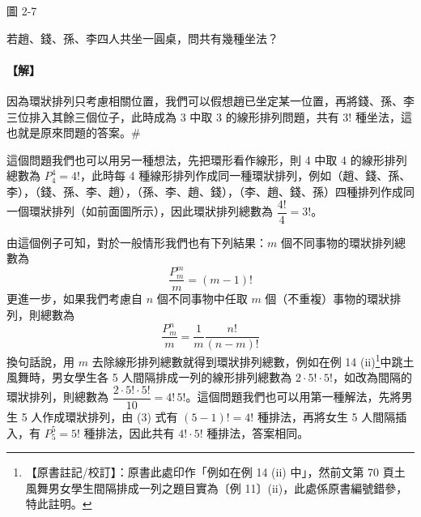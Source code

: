\begin{center}

\vspace{0.3em}
圖 2-7
\end{center}

\begin{example}\label{ex:b5s-2-12}
若趙、錢、孫、李四人共坐一圓桌，問共有幾種坐法？
\end{example}
\paragraph{【解】}
因為環狀排列只考慮相關位置，我們可以假想趙已坐定某一位置，再將錢、孫、李三位排入其餘三個位子，此時成為 3 中取 3 的線形排列問題，共有 $3!$ 種坐法，這也就是原來問題的答案。\hfill\#

這個問題我們也可以用另一種想法，先把環形看作線形，則 4 中取 4 的線形排列總數為 $P_4^4 = 4!$，此時每 4 種線形排列作成同一種環狀排列，例如（趙、錢、孫、李），（錢、孫、李、趙），（孫、李、趙、錢），（李、趙、錢、孫）四種排列作成同一個環狀排列（如前面圖所示），因此環狀排列總數為 $\dfrac{4!}{4} = 3!$。

由這個例子可知，對於一般情形我們也有下列結果：$m$ 個不同事物的環狀排列總數為
\begin{equation}
\frac{P_m^m}{m} = (m-1)!
\end{equation}
更進一步，如果我們考慮自 $n$ 個不同事物中任取 $m$ 個（不重複）事物的環狀排列，則總數為
\begin{equation}
\frac{P_m^n}{m} = \frac{1}{m} \frac{n!}{(n-m)!}
\end{equation}
換句話說，用 $m$ 去除線形排列總數就得到環狀排列總數，例如在例 14 (ii)\label{note:b5s-ch2-p74-ex14}\footnote{【原書註記/校訂】：原書此處印作「例如在例 14 (ii) 中」，然前文第 70 頁土風舞男女學生間隔排成一列之題目實為〔例 11〕(ii)，此處係原書編號錯參，特此註明。}中跳土風舞時，男女學生各 5 人間隔排成一列的線形排列總數為 $2 \cdot 5! \cdot 5!$，如改為間隔的環狀排列，則總數為 $\dfrac{2 \cdot 5! \cdot 5!}{10} = 4! \, 5!$。這個問題我們也可以用第一種解法，先將男生 5 人作成環狀排列，由 (3) 式有 $(5-1)! = 4!$ 種排法，再將女生 5 人間隔插入，有 $P_5^5 = 5!$ 種排法，因此共有 $4! \cdot 5!$ 種排法，答案相同。

